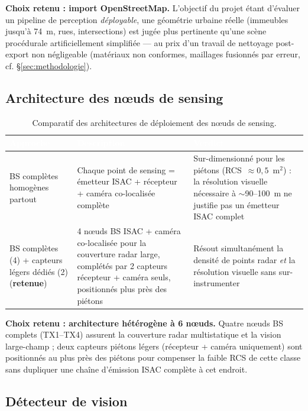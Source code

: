 \documentclass[12pt,a4paper,titlepage]{article}
\newcommand{\hd}[1]{\textcolor{white}{\textbf{#1}}}
\newcommand{\choix}{\rowcolor{tabchoice}}
\begin{document}
\textbf{Choix retenu : import OpenStreetMap.} L'objectif du projet étant d'évaluer un pipeline de perception \textit{déployable}, une géométrie urbaine réelle (immeubles jusqu'à 74~m, rues, intersections) est jugée plus pertinente qu'une scène procédurale artificiellement simplifiée --- au prix d'un travail de nettoyage post-export non négligeable (matériaux non conformes, maillages fusionnés par erreur, cf. \S\ref{sec:methodologie}).

\subsection{Architecture des n\oe uds de sensing}
\label{subsec:choix_architecture_noeuds}

\begin{table}[H]
    \centering
    \caption{Comparatif des architectures de déploiement des n\oe uds de sensing.}
    \begin{tabularx}{\textwidth}{F{4cm}LL}
        \toprule
        \hd{Approche} & \hd{Description} & \hd{Verdict} \\
        \midrule
        BS complètes homogènes partout & Chaque point de sensing = émetteur ISAC + récepteur + caméra co-localisée complète & Sur-dimensionné pour les piétons (RCS~$\approx 0{,}5$~m$^2$) : la résolution visuelle nécessaire à $\sim$90--100~m ne justifie pas un émetteur ISAC complet \\
        \choix BS complètes (4) + capteurs légers dédiés (2) (\textbf{retenue}) & 4 n\oe uds BS ISAC + caméra co-localisée pour la couverture radar large, complétés par 2 capteurs récepteur + caméra seuls, positionnés plus près des piétons & Résout simultanément la densité de points radar \textit{et} la résolution visuelle sans sur-instrumenter \\
        \bottomrule
    \end{tabularx}
\end{table}

\textbf{Choix retenu : architecture hétérogène à 6 n\oe uds.} Quatre n\oe uds BS complets (TX1--TX4) assurent la couverture radar multistatique et la vision large-champ ; deux capteurs piétons légers (récepteur + caméra uniquement) sont positionnés au plus près des piétons pour compenser la faible RCS de cette classe sans dupliquer une chaîne d'émission ISAC complète à cet endroit.

\subsection{Détecteur de vision}
\end{document}
